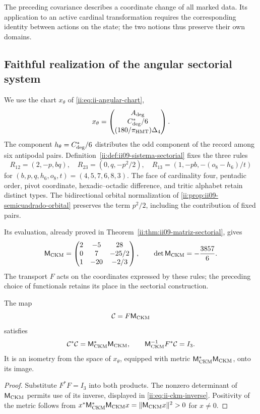 The preceding covariance describes a coordinate change of all
marked data. Its application to an active cardinal transformation requires
the corresponding identity between actions on the state; the two
notions thus preserve their own domains.

\subsection{Faithful realization of the angular sectorial system}

We use the chart \(x_\theta\) of \eqref{ii:eq:ii-angular-chart},
\[
 x_\theta=\begin{pmatrix}A_{\rm deg}\\C^*_{\rm deg}/6\\
                              (180/\pi_{\rm HMT})\Delta_4\end{pmatrix}.
\]
The component \(h_\theta=C^*_{\rm deg}/6\) distributes the odd
component of the record among six antipodal pairs.
Definition~\ref{ii:def:ii09-sistema-sectorial} fixes the three rules
\[
 R_{12}=(2,-p,bq),\quad R_{23}=(0,q,-p^2/2),\quad
 R_{13}=(1,-pb,-(o_8-h_6)/t)
\]
for \((b,p,q,h_6,o_8,t)=(4,5,7,6,8,3)\). The face of cardinality
four, pentadic order, pivot coordinate, hexadic--octadic
difference, and tritic alphabet retain distinct types.
The bidirectional orbital normalization of
\ref{ii:prop:ii09-semicuadrado-orbital} preserves the term \(p^2/2\),
including the contribution of fixed pairs.

Its evaluation, already proved in
Theorem~\ref{ii:thm:ii09-matriz-sectorial}, gives
\[
 \mathsf M_{\rm CKM}=
 \begin{pmatrix}2&-5&28\\0&7&-25/2\\1&-20&-2/3\end{pmatrix},
 \qquad\det\mathsf M_{\rm CKM}=-\frac{3857}{6}.
\]
The transport \(F\) acts on the coordinates expressed by these rules; the preceding choice of functionals retains its place in the sectorial construction.

\begin{corollary}
\label{ii:cor:ii-witt-composed-reader}
The map
\begin{equation}
 \mathcal C=F\mathsf M_{\rm CKM}
 \label{ii:eq:ii-witt-composed-reader}
\end{equation}
satisfies
\[
 \mathcal C^*\mathcal C=\mathsf M_{\rm CKM}^*\mathsf M_{\rm CKM},
 \qquad
 \mathsf M_{\rm CKM}^{-1}F^*\mathcal C=I_3.
\]
It is an isometry from the space of \(x_\theta\), equipped with metric
\(\mathsf M_{\rm CKM}^*\mathsf M_{\rm CKM}\), onto its image.
\end{corollary}
\begin{proof}
Substitute \(F^*F=I_3\) into both products. The nonzero determinant
of \(\mathsf M_{\rm CKM}\) permits use of its inverse,
displayed in \eqref{ii:eq:ii-ckm-inverse}. Positivity of the metric
follows from
\(x^*\mathsf M_{\rm CKM}^*\mathsf M_{\rm CKM}x
=\|\mathsf M_{\rm CKM}x\|^2>0\) for \(x\ne0\).
\end{proof}

